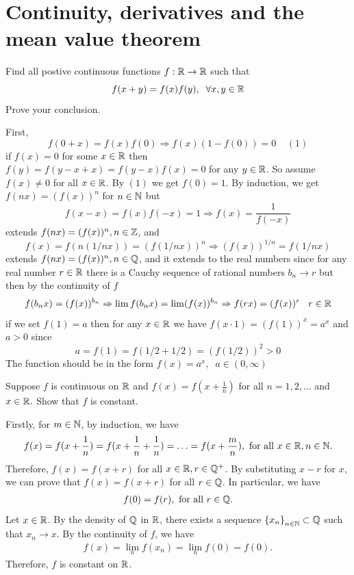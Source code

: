 \section{Continuity, derivatives and the mean value theorem}\label{p:continuity}

\begin{problem}
Find all postive continuous functions $f:\mathbb{R} \to \mathbb{R}$ such that 
    \[f(x+y) = f(x)f(y),\;\; \forall x,y\in \mathbb{R}\]
    Prove your conclusion.
\begin{solution}
First, $$f(0+x) = f(x)f(0)\Rightarrow f(x)(1-f(0))=0\;\;\;\;(1)$$ if $f(x)=0$ for some $x\in \mathbb{R}$ then $f(y) = f(y-x+x) = f(y-x)f(x)=0$ for any $y\in \mathbb{R}$. So assume $f(x)\ne 0$ for all $x\in \mathbb{R}$. By $(1)$ we get $f(0)=1$. By induction, we get $f(nx) =(f(x))^n$ for $n\in \mathbb{N}$ but $$f(x-x) = f(x)f(-x)=1\Rightarrow f(x) = \frac{1}{f(-x)}$$ extends $f(nx) =(f(x))^n, n\in \mathbb{Z}$, and $$f(x) =f(n(1/n x)) = (f(1/n x))^n\Rightarrow (f(x))^{1/n}= f(1/n x)$$ extends $f(nx)=(f(x))^n, n\in \mathbb{Q}$, and it extends to the real numbers since for any real number $r\in \mathbb{R}$ there is a Cauchy sequence of rational numbers $b_n\to r$ but then by the continuity of $f$
    \[f(b_n x) = (f(x))^{b_n} \Rightarrow \lim f(b_nx) = \lim (f(x))^{b_n} \Rightarrow f(rx) = (f(x))^r \;\;\; r\in \mathbb{R}\]if we set $f(1) = a$ then for any $x\in \mathbb{R}$ we have $f(x\cdot 1) = (f(1))^x= a^x $ and $a> 0$ since $$a = f(1) = f(1/2+1/2) = (f(1/2))^2> 0$$ 
    The function should be in the form $f(x) = a^x,\;\; a\in (0,\infty)$\newline
\end{solution}
\end{problem}

\begin{problem}
Suppose $f$ is continuous on $\mathbb{R}$ and $f(x)=f(x+\frac{1}{n})$ for all $n=1,2,\ldots $ and $x\in\mathbb{R}.$ Show that $f$ is constant.
\begin{solution}
Firstly, for $m \in \mathbb{N}$, by induction, we have 
\begin{align*}
    f(x) = f(x + \frac{1}{n}) = f(x + \frac{1}{n} + \frac{1}{n}) = \ldots = f(x + \frac{m}{n}), \text{ for all } x \in \mathbb{R}, n \in \mathbb{N}.
\end{align*}
Therefore, $f(x) = f(x+r)$ for all $x \in \mathbb{R}, r \in \mathbb{Q}^+$. By substituting $x-r$ for $x$, we can prove that $f(x) = f(x + r)$ for all $r \in \mathbb{Q}$. In particular, we have 
\begin{align*}
    f(0) = f(r), \text{ for all } r \in \mathbb{Q}.
\end{align*}
Let $x \in \mathbb{R}$. By the density of $\mathbb{Q}$ in $\mathbb{R}$, there exists a sequence $\left\{ x_n\right\}_{n \in \mathbb{N}} \subset \mathbb{Q}$ such that $x_n \to x$. By the continuity of $f$, we have 
\begin{align*}
    f(x) = \lim_n f(x_n) = \lim_n f(0) = f(0).
\end{align*}
Therefore, $f$ is constant on $\mathbb{R}$.
\end{solution}
\end{problem}

